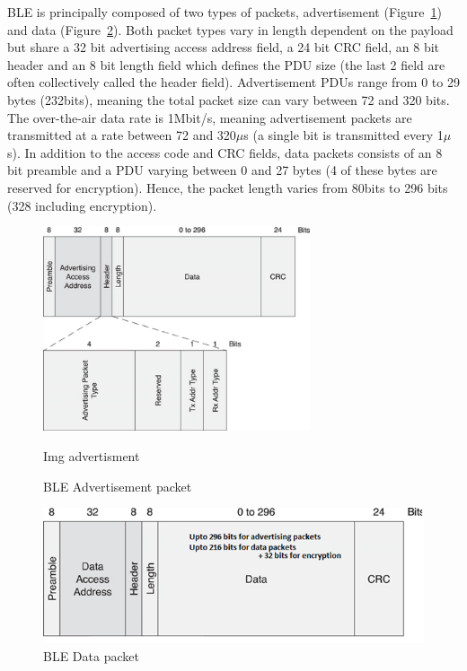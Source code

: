 \documentclass[]{article}
\begin{document}
\ac{BLE} is principally composed of two types of packets, advertisement (Figure~\ref{fig:advertisement}) and data (Figure~\ref{fig:data}). Both packet types vary in length dependent on the payload but share a 32 bit advertising access address field, a 24 bit \ac{CRC} field, an 8 bit header and an 8 bit length field which defines the \ac{PDU} size (the last 2 field are often collectively called the header field). Advertisement \ac{PDU}s range from 0 to 29 bytes (232bits), meaning the total packet size can vary between 72 and 320 bits. The over-the-air data rate is 1Mbit/s, meaning advertisement packets are transmitted at a rate between 72 and 320$\mu$s (a single bit is transmitted every 1$\mu$s). In addition to the access code and \ac{CRC} fields, data packets consists of an 8 bit preamble and a \ac{PDU} varying between 0 and 27 bytes (4 of these bytes are reserved for encryption). Hence, the packet length varies from 80bits to 296 bits (328 including encryption). 

\begin{figure}[!h]
	\centering
	\includegraphics[width = 0.7\textwidth]{advertisement}
	\caption{\ac{BLE} Advertisement packet}
	\label{fig:advertisement}
	{Img advertisment}
\end{figure}

\begin{figure}[!h]
	\begin{center}
		\includegraphics[width = 1\textwidth]{data}
	\end{center}
	\caption{\ac{BLE} Data packet}
	\label{fig:data}
\end{figure}
\end{document}
